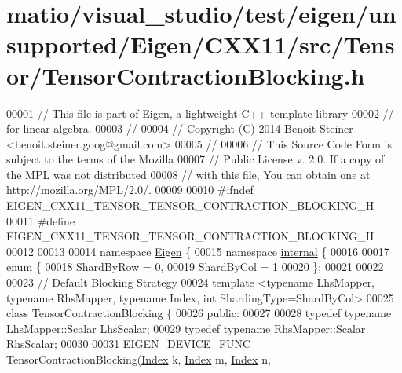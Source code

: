\hypertarget{matio_2visual__studio_2test_2eigen_2unsupported_2_eigen_2_c_x_x11_2src_2_tensor_2_tensor_contraction_blocking_8h_source}{}\section{matio/visual\+\_\+studio/test/eigen/unsupported/\+Eigen/\+C\+X\+X11/src/\+Tensor/\+Tensor\+Contraction\+Blocking.h}
\label{matio_2visual__studio_2test_2eigen_2unsupported_2_eigen_2_c_x_x11_2src_2_tensor_2_tensor_contraction_blocking_8h_source}

\begin{DoxyCode}
00001 \textcolor{comment}{// This file is part of Eigen, a lightweight C++ template library}
00002 \textcolor{comment}{// for linear algebra.}
00003 \textcolor{comment}{//}
00004 \textcolor{comment}{// Copyright (C) 2014 Benoit Steiner <benoit.steiner.goog@gmail.com>}
00005 \textcolor{comment}{//}
00006 \textcolor{comment}{// This Source Code Form is subject to the terms of the Mozilla}
00007 \textcolor{comment}{// Public License v. 2.0. If a copy of the MPL was not distributed}
00008 \textcolor{comment}{// with this file, You can obtain one at http://mozilla.org/MPL/2.0/.}
00009 
00010 \textcolor{preprocessor}{#ifndef EIGEN\_CXX11\_TENSOR\_TENSOR\_CONTRACTION\_BLOCKING\_H}
00011 \textcolor{preprocessor}{#define EIGEN\_CXX11\_TENSOR\_TENSOR\_CONTRACTION\_BLOCKING\_H}
00012 
00013 
00014 \textcolor{keyword}{namespace }\hyperlink{namespace_eigen}{Eigen} \{
00015 \textcolor{keyword}{namespace }\hyperlink{namespaceinternal}{internal} \{
00016 
00017 \textcolor{keyword}{enum} \{
00018   ShardByRow = 0,
00019   ShardByCol = 1
00020 \};
00021 
00022 
00023 \textcolor{comment}{// Default Blocking Strategy}
00024 \textcolor{keyword}{template} <\textcolor{keyword}{typename} LhsMapper, \textcolor{keyword}{typename} RhsMapper, \textcolor{keyword}{typename} Index, \textcolor{keywordtype}{int} ShardingType=ShardByCol>
00025 \textcolor{keyword}{class }TensorContractionBlocking \{
00026  \textcolor{keyword}{public}:
00027 
00028   \textcolor{keyword}{typedef} \textcolor{keyword}{typename} LhsMapper::Scalar LhsScalar;
00029   \textcolor{keyword}{typedef} \textcolor{keyword}{typename} RhsMapper::Scalar RhsScalar;
00030 
00031   EIGEN\_DEVICE\_FUNC TensorContractionBlocking(\hyperlink{namespace_eigen_a62e77e0933482dafde8fe197d9a2cfde}{Index} k, \hyperlink{namespace_eigen_a62e77e0933482dafde8fe197d9a2cfde}{Index} m, \hyperlink{namespace_eigen_a62e77e0933482dafde8fe197d9a2cfde}{Index} n, 

\end{DoxyCode}
